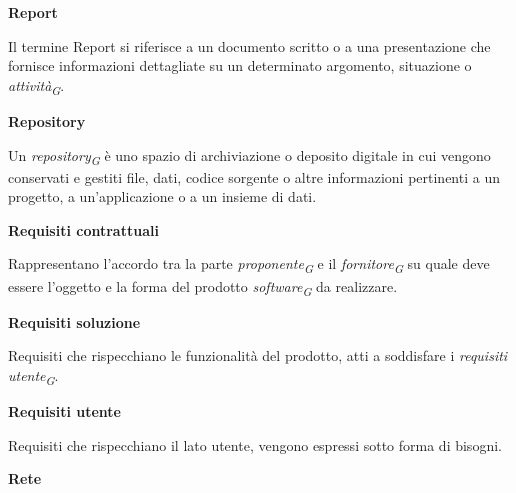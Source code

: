 \documentclass{article}
\begin{document}
\vspace{0.4cm}

\textbf{Report}

\vspace{0.1cm}

Il termine Report si riferisce a un documento scritto o a una presentazione che fornisce informazioni dettagliate su un determinato argomento, situazione o \textit{attività}\textsubscript{\textit{G}}.

\vspace{0.4cm}

\textbf{Repository}

\vspace{0.1cm}

Un \textit{repository}\textsubscript{\textit{G}} è uno spazio di archiviazione o deposito digitale in cui vengono conservati e gestiti file, dati, codice sorgente o altre informazioni pertinenti a un progetto, a un'applicazione o a un insieme di dati.

\vspace{0.4cm}

\textbf{Requisiti contrattuali}

\vspace{0.1cm}

Rappresentano l’accordo tra la parte \textit{proponente}\textsubscript{\textit{G}} e il \textit{fornitore}\textsubscript{\textit{G}} su quale deve essere l’oggetto e la forma del prodotto \textit{software}\textsubscript{\textit{G}} da realizzare.

\vspace{0.4cm}

\textbf{Requisiti soluzione}

\vspace{0.1cm}

Requisiti che rispecchiano le funzionalità del prodotto, atti a soddisfare i \textit{requisiti utente}\textsubscript{\textit{G}}.

\vspace{0.4cm}

\textbf{Requisiti utente}

\vspace{0.1cm}

Requisiti che rispecchiano il lato utente, vengono espressi sotto forma di bisogni.

\vspace{0.4cm}

\textbf{Rete}

\vspace{0.1cm}
\end{document}
